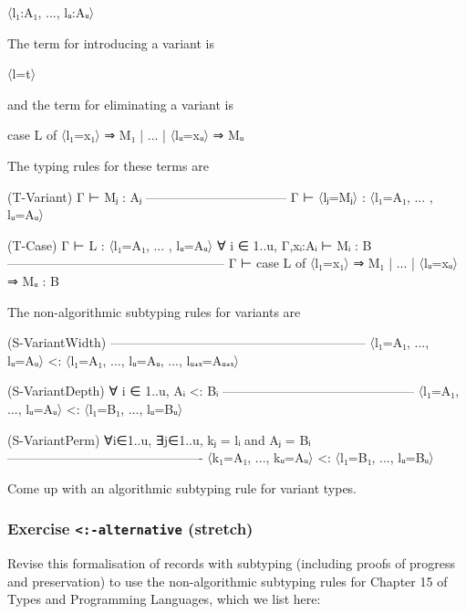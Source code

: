 \begin{myDisplay}
〈l₁:A₁, ..., lᵤ:Aᵤ〉
\end{myDisplay}

The term for introducing a variant is

\begin{myDisplay}
〈l=t〉
\end{myDisplay}

and the term for eliminating a variant is

\begin{myDisplay}
case L of 〈l₁=x₁〉 ⇒ M₁ | ... | 〈lᵤ=xᵤ〉 ⇒ Mᵤ
\end{myDisplay}

The typing rules for these terms are

\begin{myDisplay}
(T-Variant)
Γ ⊢ Mⱼ : Aⱼ
---------------------------------
Γ ⊢ 〈lⱼ=Mⱼ〉 : 〈l₁=A₁, ... , lᵤ=Aᵤ〉


(T-Case)
Γ ⊢ L : 〈l₁=A₁, ... , lᵤ=Aᵤ〉
∀ i ∈ 1..u,   Γ,xᵢ:Aᵢ ⊢ Mᵢ : B
---------------------------------------------------
Γ ⊢ case L of 〈l₁=x₁〉 ⇒ M₁ | ... | 〈lᵤ=xᵤ〉 ⇒ Mᵤ  : B
\end{myDisplay}

The non-algorithmic subtyping rules for variants are

\begin{myDisplay}
(S-VariantWidth)
------------------------------------------------------------
〈l₁=A₁, ..., lᵤ=Aᵤ〉   <:   〈l₁=A₁, ..., lᵤ=Aᵤ, ..., lᵤ₊ₓ=Aᵤ₊ₓ〉

(S-VariantDepth)
∀ i ∈ 1..u,    Aᵢ <: Bᵢ
---------------------------------------------
〈l₁=A₁, ..., lᵤ=Aᵤ〉   <:   〈l₁=B₁, ..., lᵤ=Bᵤ〉

(S-VariantPerm)
∀i∈1..u, ∃j∈1..u, kⱼ = lᵢ and Aⱼ = Bᵢ
----------------------------------------------
〈k₁=A₁, ..., kᵤ=Aᵤ〉   <:   〈l₁=B₁, ..., lᵤ=Bᵤ〉
\end{myDisplay}

Come up with an algorithmic subtyping rule for variant types.

\hypertarget{exercise--alternative-stretch}{%
\subsubsection{\texorpdfstring{Exercise
\texttt{\textless{}:-alternative}
(stretch)}{Exercise \textless:-alternative (stretch)}}\label{exercise--alternative-stretch}}

Revise this formalisation of records with subtyping (including proofs of
progress and preservation) to use the non-algorithmic subtyping rules
for Chapter 15 of Types and Programming Languages, which we list here:

